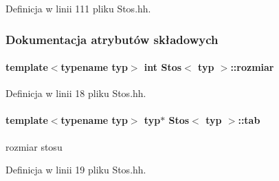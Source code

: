 Definicja w linii 111 pliku Stos.\+hh.



\subsubsection{Dokumentacja atrybutów składowych}
\hypertarget{class_stos_a66c92dc47edd280d9ea15fbcafcd9a80}{}
\paragraph[{rozmiar}]{\setlength{\rightskip}{0pt plus 5cm}template$<$typename typ$>$ int {\bf Stos}$<$ typ $>$\+::rozmiar\hspace{0.3cm}{\ttfamily [private]}}\label{class_stos_a66c92dc47edd280d9ea15fbcafcd9a80}


Definicja w linii 18 pliku Stos.\+hh.

\hypertarget{class_stos_acb9c6baeb0616796d20cfd05f6457fe3}{}
\paragraph[{tab}]{\setlength{\rightskip}{0pt plus 5cm}template$<$typename typ$>$ typ$\ast$ {\bf Stos}$<$ typ $>$\+::tab\hspace{0.3cm}{\ttfamily [private]}}\label{class_stos_acb9c6baeb0616796d20cfd05f6457fe3}
rozmiar stosu 

Definicja w linii 19 pliku Stos.\+hh.

